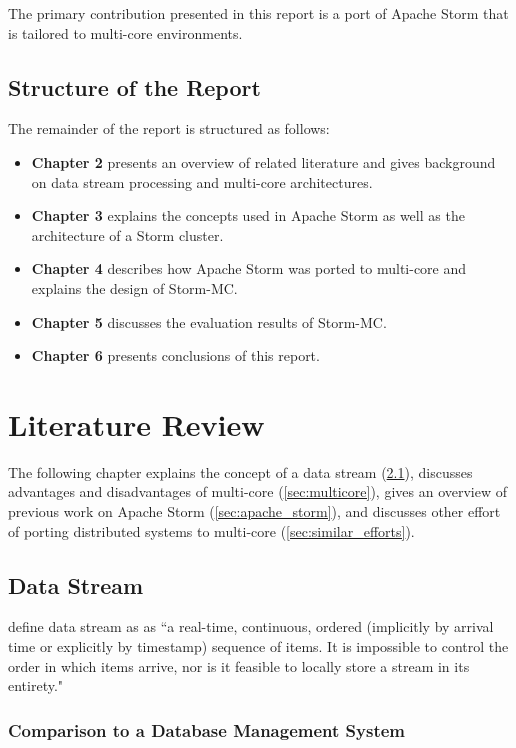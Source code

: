 \documentclass[bsc,logo,frontabs,twoside,singlespacing,normalheadings,parskip]{infthesis}\usepackage[]{graphicx}\usepackage[]{color}
\begin{document}
The primary contribution presented in this report is a port of Apache Storm that is tailored to multi-core environments.

\section{Structure of the Report}

The remainder of the report is structured as follows:

\begin{itemize}
	\item \textbf{Chapter 2} presents an overview of related literature and gives background on data stream processing and multi-core architectures.
	\item \textbf{Chapter 3} explains the concepts used in Apache Storm as well as the architecture of a Storm cluster.
	\item \textbf{Chapter 4} describes how Apache Storm was ported to multi-core and explains the design of Storm-MC.
	\item \textbf{Chapter 5} discusses the evaluation results of Storm-MC.
	\item \textbf{Chapter 6} presents conclusions of this report.
\end{itemize}
\clearpage{}

\clearpage{}\chapter{Literature Review}

The following chapter explains the concept of a data stream (\ref{sec:data_stream}), discusses advantages and disadvantages of multi-core (\ref{sec:multicore}), gives an overview of previous work on Apache Storm (\ref{sec:apache_storm}), and discusses other effort of porting distributed systems to multi-core (\ref{sec:similar_efforts}).

\section{Data Stream}
\label{sec:data_stream}

\textcite{golab2003issues} define data stream as as ``a real-time, continuous, ordered (implicitly by arrival time or explicitly by timestamp) sequence of items. It is impossible to control the order in which items arrive, nor is it feasible to locally store a stream in its entirety."

\subsection{Comparison to a Database Management System}
\end{document}
